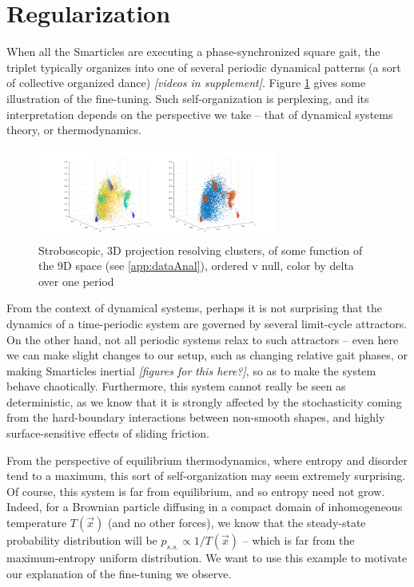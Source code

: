 \documentclass[11pt]{article}
\renewcommand{\v}[1]{\ensuremath{\vec{#1}}} %
\renewcommand{\=}[1]{\stackrel{#1}{=}} %
\renewcommand{\(}{\left (}
\renewcommand{\)}{\right  )}
\renewcommand{\[}{\left [}
\renewcommand{\]}{\right ]}
\newcommand{\<}{\left <}
\renewcommand{\>}{\right >}
\theoremstyle{definition}
\theoremstyle{remark}
\renewcommand{\todo}[1]{\textit{\color{red}[#1]}}
\begin{document}
\section{Regularization}
When all the Smarticles are executing a phase-synchronized square gait, the triplet typically organizes into one of several periodic dynamical patterns (a sort of collective organized dance) \todo{videos in supplement}. Figure \ref{fig:configSpace} gives some illustration of the fine-tuning. Such self-organization is perplexing, and its interpretation depends on the perspective we take -- that of dynamical systems theory, or thermodynamics.

\begin{figure}
	\includegraphics[width=0.7\textwidth]{scatter.pdf}
	\caption{Stroboscopic, 3D projection resolving clusters, of some function of the 9D space (see \ref{app:dataAnal}), ordered v null, color by delta over one period}
	\label{fig:configSpace}
\end{figure}

From the context of dynamical systems, perhaps it is not surprising that the dynamics of a time-periodic system are governed by several limit-cycle attractors. On the other hand, not all periodic systems relax to such attractors -- even here we can make slight changes to our setup, such as changing relative gait phases, or making Smarticles inertial \todo{figures for this here?}, so as to make the system behave chaotically. Furthermore, this system cannot really be seen as deterministic, as we know that it is strongly affected by the stochasticity coming from the hard-boundary interactions between non-smooth shapes, and highly surface-sensitive effects of sliding friction.

From the perspective of equilibrium thermodynamics, where entropy and disorder tend to a maximum, this sort of self-organization may seem extremely surprising. Of course, this system is far from equilibrium, and so entropy need not grow. Indeed, for a Brownian particle diffusing in a compact domain of inhomogeneous temperature $ T(\v{x}) $ (and no other forces), we know that the steady-state probability distribution will be $ p_{s.s.} \propto 1/T(\v{x}) $ -- which is far from the maximum-entropy uniform distribution. We want to use this example to motivate our explanation of the fine-tuning we observe. 
\end{document}
